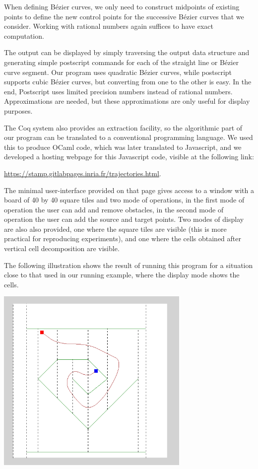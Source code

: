 \documentclass{easychair}
\begin{document}
When defining Bézier curves, we only need to construct midpoints of
existing points to define the new control points for the successive
Bézier curves that we consider.  Working with rational numbers
again suffices to have exact computation.

The output can be displayed by simply traversing the
output data structure and generating simple postscript commands for
each of the straight line or Bézier curve segment.  Our program uses
quadratic Bézier curves, while postscript supports cubic Bézier
curves, but converting from one to the other is easy.  In the end,
Postscript uses limited precision numbers instead of rational numbers.
Approximations are
needed, but these approximations are only useful for display purposes.

The Coq system also provides an extraction facility, so the
algorithmic part of our program can be translated to a conventional
programming language.  We used this to produce OCaml code, which was
later translated to Javascript, and we developed a hosting webpage for
this Javascript code, visible at the following link:
\begin{center}
\url{https://stamp.gitlabpages.inria.fr/trajectories.html}.
\end{center}

\pagebreak

The minimal user-interface provided on that page gives access to a 
window with a board of 40 by 40 square tiles and two mode of operations, in
the first mode of operation the user can add and remove obstacles, in the
second mode of operation the user can add the source and target points.  Two
modes of display are also also provided, one where the square tiles are
visible (this is more practical for reproducing experiments), and one where
the cells obtained after vertical cell decomposition are visible.

The following illustration shows the result of running this program for
a situation close to that used in our running example, where the display mode
shows the cells.
\begin{center}
\includegraphics[width=0.7\textwidth]{illustration.png}
\end{center}
\end{document}
